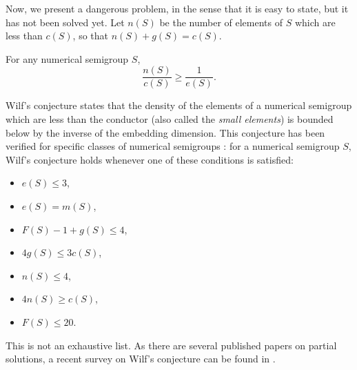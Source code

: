 Now, we present a dangerous problem, in the sense that it is easy to state, but it has not been solved yet. Let $n(S)$ be the number of elements of $S$ which are less than $c(S)$, so that $n(S) + g(S) = c(S)$.\par 

\begin{conjecture}[Wilf, 1978] \cite{wilf1978circle}\label{conj:smgps:wilf}
    For any numerical semigroup $S$,
    \[\frac{n(S)}{c(S)} \geq \frac{1}{e(S)}.\]
\end{conjecture}

Wilf's conjecture states that the density of the elements of a numerical semigroup which are less than the conductor (also called the \textit{small elements}) is bounded below by the inverse of the embedding dimension. This conjecture has been verified for specific classes of numerical semigroups \cite{assi2020numerical}: for a numerical semigroup $S$, Wilf's conjecture holds whenever one of these conditions is satisfied:
\begin{itemize}
    \item $e(S) \leq 3$,
    \item $e(S) = m(S)$,
    \item $F(S) - 1 + g(S) \leq 4$,
    \item $4g(S) \leq 3c(S)$,
    \item $n(S) \leq 4$,
    \item $4n(S) \geq c(S)$,
    \item $F(S) \leq 20$.
\end{itemize}

This is not an exhaustive list. As there are several published papers on partial solutions, a recent survey on Wilf's conjecture can be found in \cite{2020conjecture}. \par